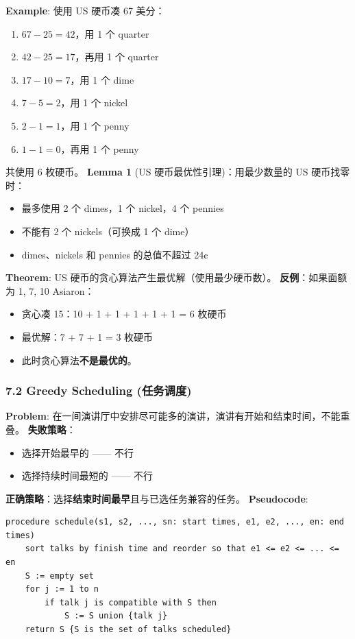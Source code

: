\documentclass[10pt,a4paper,openany]{ctexbook}
\theoremstyle{definition}
\theoremstyle{remark}
\begin{document}
\textbf{Example}: 使用 US 硬币凑 67 美分：
\begin{enumerate}
\item $67 - 25 = 42$，用 1 个 quarter
\item $42 - 25 = 17$，再用 1 个 quarter
\item $17 - 10 = 7$，用 1 个 dime
\item $7 - 5 = 2$，用 1 个 nickel
\item $2 - 1 = 1$，用 1 个 penny
\item $1 - 1 = 0$，再用 1 个 penny
\end{enumerate}

共使用 6 枚硬币。
\textbf{Lemma 1} (US 硬币最优性引理)：用最少数量的 US 硬币找零时：
\begin{itemize}
\item 最多使用 2 个 dimes，1 个 nickel，4 个 pennies
\item 不能有 2 个 nickels（可换成 1 个 dime）
\item dimes、nickels 和 pennies 的总值不超过 24¢

\end{itemize}

\textbf{Theorem}: US 硬币的贪心算法产生最优解（使用最少硬币数）。
\textbf{反例}：如果面额为 {1, 7, 10} Asiaron：
\begin{itemize}
\item 贪心凑 15：10 + 1 + 1 + 1 + 1 + 1 = 6 枚硬币
\item 最优解：7 + 7 + 1 = 3 枚硬币
\item 此时贪心算法\textbf{不是最优的}。

\end{itemize}

\subsubsection{7.2 Greedy Scheduling (任务调度)}

\textbf{Problem}: 在一间演讲厅中安排尽可能多的演讲，演讲有开始和结束时间，不能重叠。
\textbf{失败策略}：
\begin{itemize}
\item 选择开始最早的 —— 不行
\item 选择持续时间最短的 —— 不行

\end{itemize}

\textbf{正确策略}：选择\textbf{结束时间最早}且与已选任务兼容的任务。
\textbf{Pseudocode}:
{\footnotesize\begin{verbatim}
procedure schedule(s1, s2, ..., sn: start times, e1, e2, ..., en: end times)
    sort talks by finish time and reorder so that e1 <= e2 <= ... <= en
    S := empty set
    for j := 1 to n
        if talk j is compatible with S then
            S := S union {talk j}
    return S {S is the set of talks scheduled}
\end{verbatim}}
\end{document}
